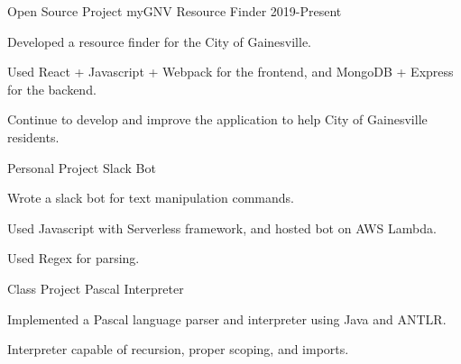 

\begin{cventries}

\cventry
    {Open Source Project} %
    {myGNV Resource Finder} %
    {} %
    {2019-Present} %
    {
    \begin{cvitems} %
        \item {Developed a resource finder for the City of Gainesville.}
        \item {Used React + Javascript + Webpack for the frontend, and MongoDB + Express for the backend.}
        \item {Continue to develop and improve the application to help City of Gainesville residents.}
    \end{cvitems}
    }


  \cventry
    {Personal Project} %
    {Slack Bot} %
    {} %
    {} %
    {
      \begin{cvitems} %
        \item {Wrote a slack bot for text manipulation commands.}
        \item {Used Javascript with Serverless framework, and hosted bot on AWS Lambda.}
        \item {Used Regex for parsing.}
      \end{cvitems}
    }


  \cventry
    {Class Project} %
    {Pascal Interpreter} %
    {} %
    {} %
    {
      \begin{cvitems} %
        \item {Implemented a Pascal language parser and interpreter using Java and ANTLR.}
        \item {Interpreter capable of recursion, proper scoping, and imports.}
      \end{cvitems}
    }

\end{cventries}